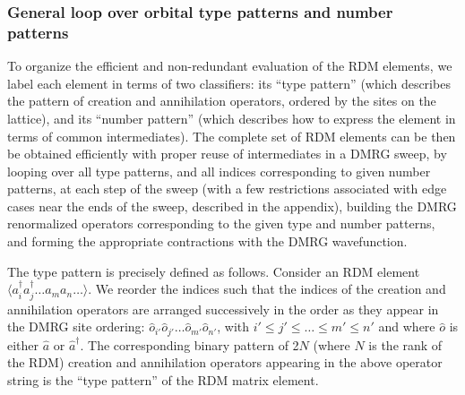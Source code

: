 \subsubsection{General loop over orbital type patterns and number patterns}

To organize the efficient and non-redundant evaluation of the RDM elements, we label each element in terms of two classifiers: its ``type pattern'' (which describes
the pattern of creation and annihilation operators, ordered by the sites on the lattice), and its ``number pattern'' (which describes how to express
the element in terms of common intermediates). The complete set of RDM elements can be then be obtained efficiently with
proper reuse of intermediates in a DMRG sweep, by looping over all 
type patterns, and all indices corresponding to given number patterns, at each step of the sweep (with a few restrictions associated with edge cases near the ends of the sweep, described in the appendix), building the DMRG renormalized operators corresponding to the given type and number patterns, and forming
the appropriate contractions with the DMRG wavefunction.

The type pattern is precisely defined as follows. Consider an RDM element $\langle {a}^\dagger_i{a}^\dagger_j\dots {a}_m{a}_n\dots \rangle$. 
We reorder the indices such that the indices of the creation and annihilation operators are arranged successively in the order as they appear
in the DMRG site ordering: $\hat{o}_{i'}\hat{o}_{j'}\dots \hat{o}_{m'}\hat{o}_{n'}$, with $i'\le j'\le \dots \le m' \le n'$ and where $\hat{o}$ is either $\hat{a}$ or $\hat{a}^\dagger$.
The corresponding binary pattern of 2$N$ (where $N$ is the rank of the RDM) creation and annihilation operators appearing in the above operator string 
is the ``type pattern'' of the RDM matrix element.

